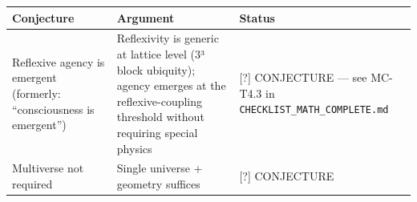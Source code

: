 \documentclass[
  11pt,
  letterpaper,
  twoside,
  openright]{book}
\begin{document}
\begin{longtable}[]{@{}
  >{\raggedright\arraybackslash}p{}
  >{\raggedright\arraybackslash}p{}
  >{\raggedright\arraybackslash}p{}@{}}
\toprule\noalign{}
\begin{minipage}[b]{\linewidth}\raggedright
Conjecture
\end{minipage} & \begin{minipage}[b]{\linewidth}\raggedright
Argument
\end{minipage} & \begin{minipage}[b]{\linewidth}\raggedright
Status
\end{minipage} \\
\midrule\noalign{}
\endhead
\bottomrule\noalign{}
\endlastfoot
Reflexive agency is emergent (formerly: ``consciousness is emergent'') &
Reflexivity is generic at lattice level (3³ block ubiquity); agency
emerges at the reflexive-coupling threshold without requiring special
physics & {[}?{]} CONJECTURE --- see MC-T4.3 in
\texttt{CHECKLIST\_MATH\_COMPLETE.md} \\
Multiverse not required & Single universe + geometry suffices & {[}?{]}
CONJECTURE \\
\end{longtable}
\end{document}

